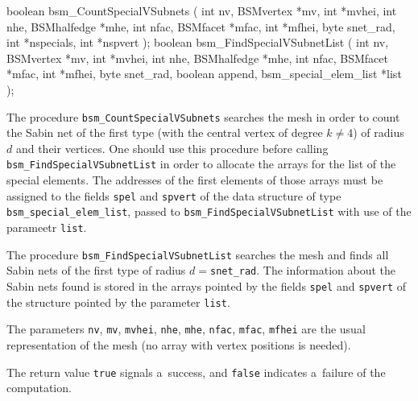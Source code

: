 \medskip
\begin{listingC}
boolean bsm_CountSpecialVSubnets ( int nv, BSMvertex *mv, int *mvhei,
                                   int nhe, BSMhalfedge *mhe,
                                   int nfac, BSMfacet *mfac, int *mfhei,
                                   byte snet_rad,
                                   int *nspecials, int *nspvert );
boolean bsm_FindSpecialVSubnetList (
                               int nv, BSMvertex *mv, int *mvhei,
                               int nhe, BSMhalfedge *mhe,
                               int nfac, BSMfacet *mfac, int *mfhei,
                               byte snet_rad,
                               boolean append,
                               bsm_special_elem_list *list );
\end{listingC}
The procedure \texttt{bsm\_CountSpecialVSubnets} searches the mesh in order
to count the Sabin net of the first type (with the central vertex of degree
$k\neq 4$) of radius~$d$ and their vertices. One should use this procedure
before calling \texttt{bsm\_FindSpecialVSubnetList} in order to allocate the
arrays for the list of the special elements. The addresses of the first
elements of those arrays must be assigned to the fields \texttt{spel} and
\texttt{spvert} of the data structure of type
\texttt{bsm\_special\_elem\_list}, passed to
\texttt{bsm\_FindSpecialVSubnetList} with use of the parameetr
\texttt{list}.

The procedure \texttt{bsm\_FindSpecialVSubnetList} searches the mesh and
finds all Sabin nets of the first type of radius $d=$\texttt{snet\_rad}.
The information about the Sabin nets found is stored in the arrays pointed
by the fields \texttt{spel} and \texttt{spvert} of the structure pointed
by the parameter \texttt{list}.

The parameters \texttt{nv}, \texttt{mv}, \texttt{mvhei}, \texttt{nhe},
\texttt{mhe}, \texttt{nfac}, \texttt{mfac}, \texttt{mfhei} are the usual
representation of the mesh (no array with vertex positions is needed).

The return value \texttt{true} signals a~success, and \texttt{false}
indicates a~failure of the computation.



